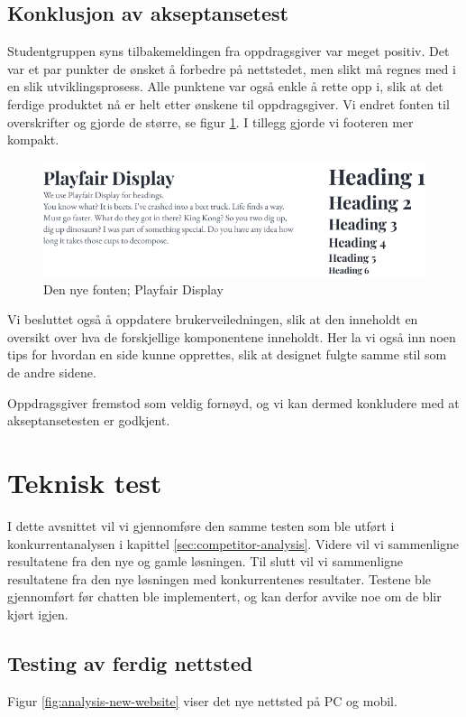 \subsection{Konklusjon av akseptansetest}
Studentgruppen syns tilbakemeldingen fra oppdragsgiver var meget positiv. Det var et par punkter de ønsket å forbedre på nettstedet, men slikt må regnes med i en slik utviklingsprosess. Alle punktene var også enkle å rette opp i, slik at det ferdige produktet nå er helt etter ønskene til oppdragsgiver. Vi endret fonten til overskrifter og gjorde de større, se figur \ref{fig:typography-new}. I tillegg gjorde vi footeren mer kompakt.
\begin{figure}[H]
    \centering
    \includegraphics[width=\textwidth]{design/typography-headings.png}
    \caption{Den nye fonten; Playfair Display}
    \label{fig:typography-new}
\end{figure}

Vi besluttet også å oppdatere brukerveiledningen, slik at den inneholdt en oversikt over hva de forskjellige komponentene inneholdt. Her la vi også inn noen tips for hvordan en side kunne opprettes, slik at designet fulgte samme stil som de andre sidene.

Oppdragsgiver fremstod som veldig fornøyd, og vi kan dermed konkludere med at akseptansetesten er godkjent.

\section{Teknisk test}
I dette avsnittet vil vi gjennomføre den samme testen som ble utført i konkurrentanalysen i kapittel \ref{sec:competitor-analysis}. Videre vil vi sammenligne resultatene fra den nye og gamle løsningen. Til slutt vil vi sammenligne resultatene fra den nye løsningen med konkurrentenes resultater. Testene ble gjennomført før chatten ble implementert, og kan derfor avvike noe om de blir kjørt igjen.

\subsection{Testing av ferdig nettsted}
Figur \ref{fig:analysis-new-website} viser det nye nettsted på PC og mobil.

